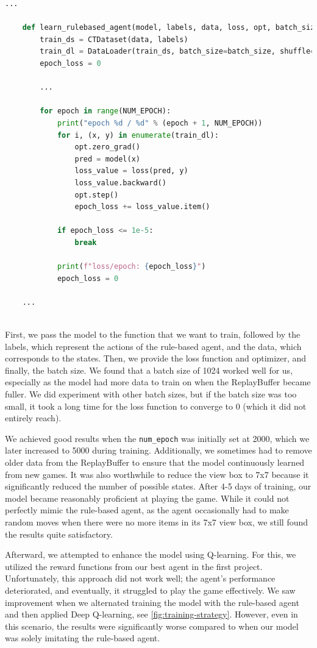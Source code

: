 \begin{lstlisting}[language=Python]
    ...
    
    def learn_rulebased_agent(model, labels, data, loss, opt, batch_size):
        train_ds = CTDataset(data, labels)
        train_dl = DataLoader(train_ds, batch_size=batch_size, shuffle=True)
        epoch_loss = 0

        ...

        for epoch in range(NUM_EPOCH):
            print("epoch %d / %d" % (epoch + 1, NUM_EPOCH))
            for i, (x, y) in enumerate(train_dl):
                opt.zero_grad()
                pred = model(x)
                loss_value = loss(pred, y) 
                loss_value.backward() 
                opt.step()
                epoch_loss += loss_value.item() 

            if epoch_loss <= 1e-5:
                break

            print(f"loss/epoch: {epoch_loss}")
            epoch_loss = 0      

    ...
    
\end{lstlisting}

First, we pass the model to the function that we want to train, followed by the labels, 
which represent the actions of the rule-based agent, and the data, which corresponds to the states. 
Then, we provide the loss function and optimizer, and finally, the batch size. We found that a batch size of 1024 worked well for us, 
especially as the model had more data to train on when the ReplayBuffer became fuller. We did experiment with other batch sizes,
but if the batch size was too small, it took a long time for the loss function to converge to 0 (which it did not entirely reach).

We achieved good results when the \verb|num_epoch| was initially set at 2000, which we later increased to 5000 during training. 
Additionally, we sometimes had to remove older data from the ReplayBuffer to ensure that the model continuously learned from new games. 
It was also worthwhile to reduce the view box to 7x7 because it significantly reduced the number of possible states. 
After 4-5 days of training, our model became reasonably proficient at playing the game. While it could not perfectly mimic the rule-based agent, 
as the agent occasionally had to make random moves when there were no more items in its 7x7 view box, we still found the results quite satisfactory.

Afterward, we attempted to enhance the model using Q-learning. For this, we utilized the reward functions from our best agent in the first project. 
Unfortunately, this approach did not work well; the agent's performance deteriorated, and eventually, it struggled to play the game effectively. 
We saw improvement when we alternated training the model with the rule-based agent and then applied Deep Q-learning, see \autoref{fig:training-strategy}. 
However, even in this scenario, 
the results were significantly worse compared to when our model was solely imitating the rule-based agent.

